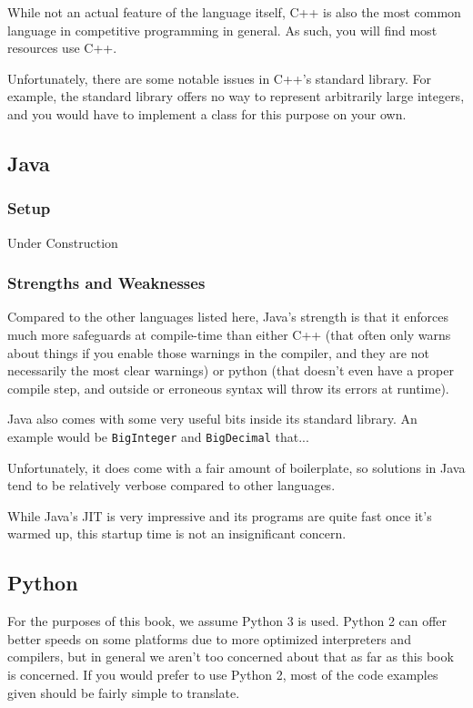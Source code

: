While not an actual feature of the language itself, C++ is also the most common language in competitive programming in general. As such, you will find most resources use C++.

Unfortunately, there are some notable issues in C++'s standard library. For example, the standard library offers no way to represent arbitrarily large integers, and you would have to implement a class for this purpose on your own.

\subsection{Java}

\subsubsection{Setup}

Under Construction

\subsubsection{Strengths and Weaknesses}

Compared to the other languages listed here, Java's strength is that it enforces much more safeguards at compile-time than either C++ (that often only warns about things if you enable those warnings in the compiler, and they are not necessarily the most clear warnings) or python (that doesn't even have a proper compile step, and outside or erroneous syntax will throw its errors at runtime).

Java also comes with some very useful bits inside its standard library. An example would be \texttt{BigInteger} and \texttt{BigDecimal} that...

Unfortunately, it does come with a fair amount of boilerplate, so solutions in Java tend to be relatively verbose compared to other languages.

While Java's JIT is very impressive and its programs are quite fast once it's warmed up, this startup time is not an insignificant concern.

\subsection{Python}

For the purposes of this book, we assume Python 3 is used. Python 2 can offer better speeds on some platforms due to more optimized interpreters and compilers, but in general we aren't too concerned about that as far as this book is concerned. If you would prefer to use Python 2, most of the code examples given should be fairly simple to translate.

